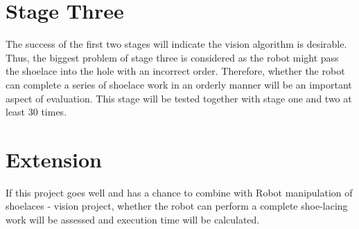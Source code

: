 \section{Stage Three}
The success of the first two stages will indicate the vision algorithm is desirable. Thus, the biggest problem of stage three is considered as the robot might pass the shoelace into the hole with an incorrect order. Therefore, whether the robot can complete a series of shoelace work in an orderly manner will be an important aspect of evaluation. This stage will be tested together with stage one and two at least 30 times.

\section{Extension}
If this project goes well and has a chance to combine with Robot manipulation of shoelaces - vision project, whether the robot can perform a complete shoe-lacing work will be assessed and execution time will be calculated.